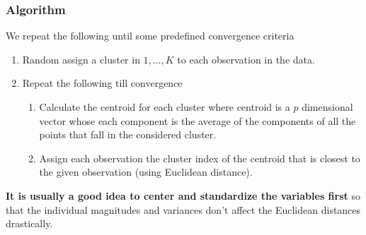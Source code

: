 \documentclass[11pt, a4paper]{article}
\begin{document}
    \subsubsection{Algorithm}
    We repeat the following until some predefined convergence criteria
    \begin{enumerate}
        \item Random assign a cluster in $1, \ldots, K$ to each observation in the data.
        \item Repeat the following till convergence
        \begin{enumerate}
            \item Calculate the centroid for each cluster where centroid is a $p$ dimensional vector whose each component is the average of the components of all the points that fall in the considered cluster.
            \item Assign each observation the cluster index of the centroid that is closest to the given observation (using Euclidean distance).
        \end{enumerate}
    \end{enumerate}

    \textbf{It is usually a good idea to center and standardize the variables first} so that the individual magnitudes and variances don't affect the Euclidean distances drastically.
\end{document}
